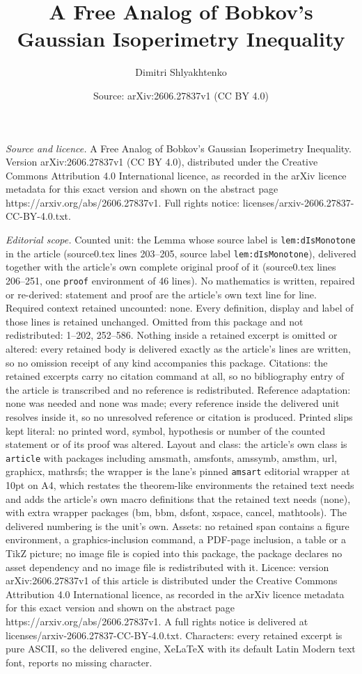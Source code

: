 \documentclass[10pt,a4paper]{amsart}
\title[A Free Analog of Bobkov's Gaussian Isoperimetry Inequality]{A Free Analog of Bobkov's Gaussian Isoperimetry Inequality}
\author{Dimitri Shlyakhtenko}
\date{Source: arXiv:2606.27837v1 (CC BY 4.0)}
\begin{document}
\maketitle

\noindent\emph{Source and licence.} A Free Analog of Bobkov's Gaussian Isoperimetry Inequality. Version arXiv:2606.27837v1 (CC BY 4.0), distributed under the Creative Commons Attribution 4.0 International licence, as recorded in the arXiv licence metadata for this exact version and shown on the abstract page https://arxiv.org/abs/2606.27837v1. Full rights notice: licenses/arxiv-2606.27837-CC-BY-4.0.txt.\par\smallskip

\noindent\textit{Editorial scope.} Counted unit: the Lemma whose source label is \texttt{lem:dIsMonotone} in the article (source0.tex lines 203--205, source label \texttt{lem:dIsMonotone}), delivered together with the article's own complete original proof of it (source0.tex lines 206--251, one \texttt{proof} environment of 46 lines). No mathematics is written, repaired or re-derived: statement and proof are the article's own text line for line. Required context retained uncounted: none. Every definition, display and label of those lines is retained unchanged. Omitted from this package and not redistributed: 1--202, 252--586. Nothing inside a retained excerpt is omitted or altered: every retained body is delivered exactly as the article's lines are written, so no omission receipt of any kind accompanies this package. Citations: the retained excerpts carry no citation command at all, so no bibliography entry of the article is transcribed and no reference is redistributed. Reference adaptation: none was needed and none was made; every reference inside the delivered unit resolves inside it, so no unresolved reference or citation is produced. Printed slips kept literal: no printed word, symbol, hypothesis or number of the counted statement or of its proof was altered. Layout and class: the article's own class is \texttt{article} with packages including amsmath, amsfonts, amssymb, amsthm, url, graphicx, mathrsfs; the wrapper is the lane's pinned \texttt{amsart} editorial wrapper at 10pt on A4, which restates the theorem-like environments the retained text needs and adds the article's own macro definitions that the retained text needs (none), with extra wrapper packages (bm, bbm, dsfont, xspace, cancel, mathtools). The delivered numbering is the unit's own. Assets: no retained span contains a figure environment, a graphics-inclusion command, a PDF-page inclusion, a table or a TikZ picture; no image file is copied into this package, the package declares no asset dependency and no image file is redistributed with it. Licence: version arXiv:2606.27837v1 of this article is distributed under the Creative Commons Attribution 4.0 International licence, as recorded in the arXiv licence metadata for this exact version and shown on the abstract page https://arxiv.org/abs/2606.27837v1. A full rights notice is delivered at licenses/arxiv-2606.27837-CC-BY-4.0.txt. Characters: every retained excerpt is pure ASCII, so the delivered engine, XeLaTeX with its default Latin Modern text font, reports no missing character.
\end{document}

